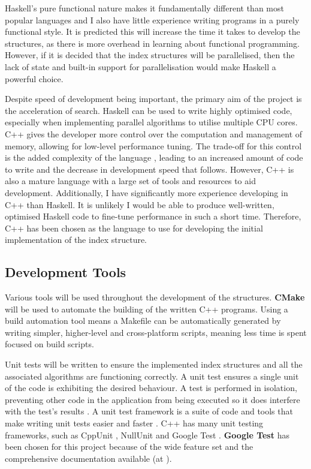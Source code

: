 Haskell's pure functional nature makes it fundamentally different than most popular languages and I also have little experience writing programs in a purely functional style. It is predicted this will increase the time it takes to develop the structures, as there is more overhead in learning about functional programming. However, if it is decided that the index structures will be parallelised, then the lack of state and built-in support for parallelisation \cite{parallel-haskell} would make Haskell a powerful choice.

Despite speed of development being important, the primary aim of the project is the acceleration of search. Haskell can be used to write highly optimised code, especially when implementing parallel algorithms to utilise multiple CPU cores. C++ gives the developer more control over the computation and management of memory, allowing for low-level performance tuning. The trade-off for this control is the added complexity of the language \cite{cpp-hard}, leading to an increased amount of code to write and the decrease in development speed that follows. However, C++ is also a mature language with a large set of tools and resources to aid development. Additionally, I have significantly more experience developing in C++ than Haskell. It is unlikely I would be able to produce well-written, optimised Haskell code to fine-tune performance in such a short time. Therefore, C++ has been chosen as the language to use for developing the initial implementation of the index structure.

\subsection{Development Tools}
\label{sec:development-tools}

Various tools will be used throughout the development of the structures. \textbf{CMake} \cite{cmake} will be used to automate the building of the written C++ programs. Using a build automation tool means a Makefile can be automatically generated by writing simpler, higher-level and cross-platform scripts, meaning less time is spent focused on build scripts.

Unit tests will be written to ensure the implemented index structures and all the associated algorithms are functioning correctly. A unit test ensures a single unit of the code is exhibiting the desired behaviour. A test is performed in isolation, preventing other code in the application from being executed so it does interfere with the test's results \cite{automated-defect-prevention}. A unit test framework is a suite of code and tools that make writing unit tests easier and faster \cite{unit-test-frameworks}. C++ has many unit testing frameworks, such as CppUnit \cite{cppunit}, NullUnit \cite{nullunit} and Google Test \cite{google-test}. \textbf{Google Test} has been chosen for this project because of the wide feature set and the comprehensive documentation available (at \cite{google-test}).

